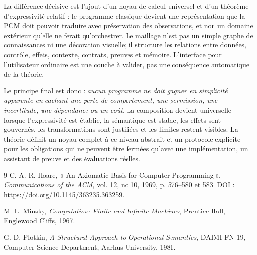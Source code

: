 \documentclass[11pt,a4paper,openany]{book}
\theoremstyle{definition}
\theoremstyle{plain}
\theoremstyle{remark}
\begin{document}
La différence décisive est l'ajout d'un noyau de calcul universel et d'un théorème d'expressivité relatif : le programme classique devient une représentation que la PCM doit pouvoir traduire avec préservation des observations, et non un domaine extérieur qu'elle ne ferait qu'orchestrer. Le maillage n'est pas un simple graphe de connaissances ni une décoration visuelle; il structure les relations entre données, contrôle, effets, contexte, contrats, preuves et mémoire. L'interface pour l'utilisateur ordinaire est une couche à valider, pas une conséquence automatique de la théorie.

Le principe final est donc : \emph{aucun programme ne doit gagner en simplicité apparente en cachant une perte de comportement, une permission, une incertitude, une dépendance ou un coût}. La composition devient universelle lorsque l'expressivité est établie, la sémantique est stable, les effets sont gouvernés, les transformations sont justifiées et les limites restent visibles. La théorie définit un noyau complet à ce niveau abstrait et un protocole explicite pour les obligations qui ne peuvent être fermées qu'avec une implémentation, un assistant de preuve et des évaluations réelles.

\backmatter
\begin{thebibliography}{9}
C. A. R. Hoare, « An Axiomatic Basis for Computer Programming », \emph{Communications of the ACM}, vol. 12, no 10, 1969, p. 576--580 et 583. DOI : \url{https://doi.org/10.1145/363235.363259}.

M. L. Minsky, \emph{Computation: Finite and Infinite Machines}, Prentice-Hall, Englewood Cliffs, 1967.

G. D. Plotkin, \emph{A Structural Approach to Operational Semantics}, DAIMI FN-19, Computer Science Department, Aarhus University, 1981.

\end{thebibliography}
\end{document}
